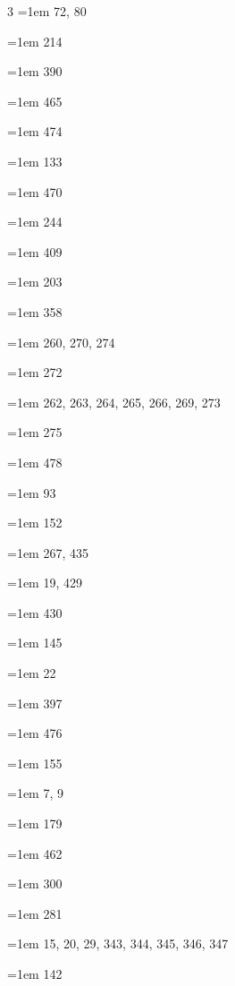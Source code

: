 \begin{multicols}{3}
\hangindent=1em  72, 80\par
\hangindent=1em  214\par
\hangindent=1em  390\par
\hangindent=1em  465\par
\hangindent=1em  474\par
\hangindent=1em  133\par
\hangindent=1em  470\par
\hangindent=1em  244\par
\hangindent=1em  409\par
\hangindent=1em  203\par
\hangindent=1em  358\par
\hangindent=1em  260, 270, 274\par
\hangindent=1em  272\par
\hangindent=1em  262, 263, 264, 265, 266, 269, 273\par
\hangindent=1em  275\par
\hangindent=1em  478\par
\hangindent=1em  93\par
\hangindent=1em  152\par
\hangindent=1em  267, 435\par
\hangindent=1em  19, 429\par
\hangindent=1em  430\par
\hangindent=1em  145\par
\hangindent=1em  22\par
\hangindent=1em  397\par
\hangindent=1em  476\par
\hangindent=1em  155\par
\hangindent=1em  7, 9\par
\hangindent=1em  179\par
\hangindent=1em  462\par
\hangindent=1em  300\par
\hangindent=1em  281\par
\hangindent=1em  15, 20, 29, 343, 344, 345, 346, 347\par
\hangindent=1em  142\par

\end{multicols}

